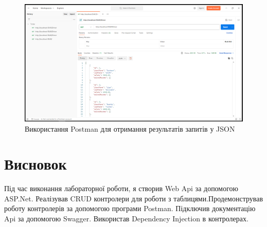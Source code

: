 \documentclass[14pt]{extreport}
\begin{document}
\begin{normalsize}
	
	\begin{figure}[H]
		\centering
		\includegraphics[scale=0.4]{2}
		\caption{Використання Postman для отримання результатів запитів у JSON}
	\end{figure}
	
	\section*{Висновок}
	Під час виконання лабораторної роботи, я створив Web Api за допомогою ASP.Net. Реалізував CRUD контролери для роботи з таблицями.Продемонстрував роботу контролерів за допомогою програми Postman. Підключив документацію Api за допомогою Swagger. Використав Dependency Injection в контролерах.
	
	 
\end{normalsize}
\end{document}
